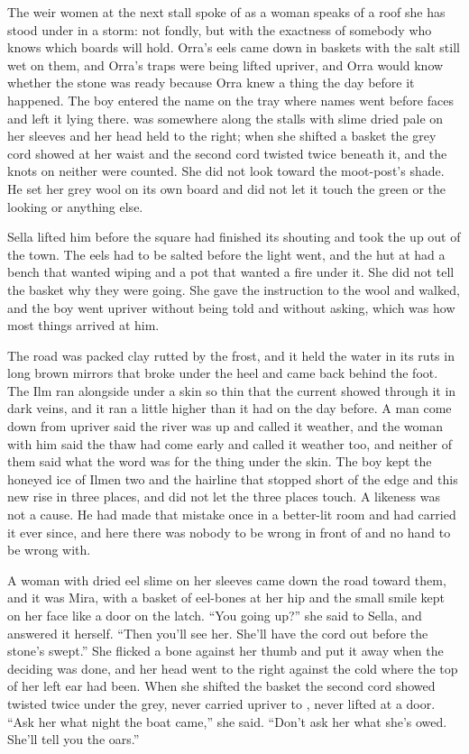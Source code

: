 The weir women at the next stall spoke of  as a woman speaks of a roof she has stood under in a storm: not fondly, but with the exactness of somebody who knows which boards will hold. Orra's eels came down in baskets with the salt still wet on them, and Orra's traps were being lifted upriver, and Orra would know whether the stone was ready because Orra knew a thing the day before it happened. The boy entered the name on the tray where names went before faces and left it lying there.  was somewhere along the stalls with slime dried pale on her sleeves and her head held to the right; when she shifted a basket the grey cord showed at her waist and the second cord twisted twice beneath it, and the knots on neither were counted. She did not look toward the moot-post's shade. He set her grey wool on its own board and did not let it touch the green or the looking or anything else.

Sella lifted him before the square had finished its shouting and took the  up out of the town. The eels had to be salted before the light went, and the hut at  had a bench that wanted wiping and a pot that wanted a fire under it. She did not tell the basket why they were going. She gave the instruction to the wool and walked, and the boy went upriver without being told and without asking, which was how most things arrived at him.

\scenebreak

The road was packed clay rutted by the frost, and it held the water in its ruts in long brown mirrors that broke under the heel and came back behind the foot. The Ilm ran alongside under a skin so thin that the current showed through it in dark veins, and it ran a little higher than it had on the day before. A man come down from upriver said the river was up and called it weather, and the woman with him said the thaw had come early and called it weather too, and neither of them said what the word was for the thing under the skin. The boy kept the honeyed ice of Ilmen two and the hairline that stopped short of the edge and this new rise in three places, and did not let the three places touch. A likeness was not a cause. He had made that mistake once in a better-lit room and had carried it ever since, and here there was nobody to be wrong in front of and no hand to be wrong with.

A woman with dried eel slime on her sleeves came down the road toward them, and it was Mira, with a basket of eel-bones at her hip and the small smile kept on her face like a door on the latch. “You going up?” she said to Sella, and answered it herself. “Then you'll see her. She'll have the cord out before the stone's swept.” She flicked a bone against her thumb and put it away when the deciding was done, and her head went to the right against the cold where the top of her left ear had been. When she shifted the basket the second cord showed twisted twice under the grey, never carried upriver to , never lifted at a door. “Ask her what night the boat came,” she said. “Don't ask her what she's owed. She'll tell you the oars.”

